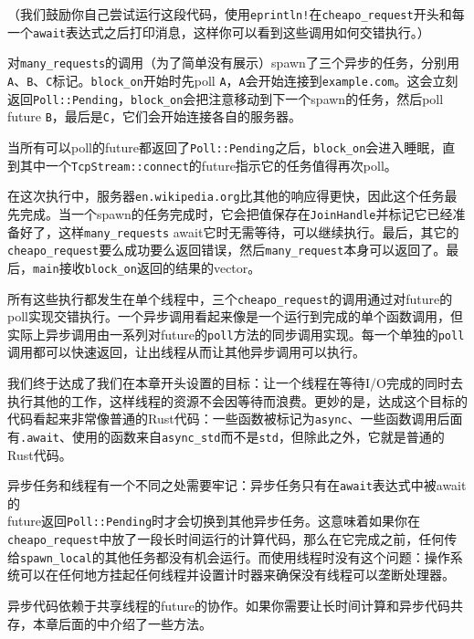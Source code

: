 （我们鼓励你自己尝试运行这段代码，使用\texttt{eprintln!}在\texttt{cheapo\_request}开头和每一个\texttt{await}表达式之后打印消息，这样你可以看到这些调用如何交错执行。）

对\texttt{many\_requests}的调用（为了简单没有展示）spawn了三个异步的任务，分别用\texttt{A}、\texttt{B}、\texttt{C}标记。\texttt{block\_on}开始时先poll \texttt{A}，\texttt{A}会开始连接到\texttt{example.com}。这会立刻返回\texttt{Poll::Pending}，\texttt{block\_on}会把注意移动到下一个spawn的任务，然后poll future \texttt{B}，最后是\texttt{C}，它们会开始连接各自的服务器。

当所有可以poll的future都返回了\texttt{Poll::Pending}之后，\texttt{block\_on}会进入睡眠，直到其中一个\texttt{TcpStream::connect}的future指示它的任务值得再次poll。

在这次执行中，服务器\texttt{en.wikipedia.org}比其他的响应得更快，因此这个任务最先完成。当一个spawn的任务完成时，它会把值保存在\texttt{JoinHandle}并标记它已经准备好了，这样\texttt{many\_requests} await它时无需等待，可以继续执行。最后，其它的\texttt{cheapo\_request}要么成功要么返回错误，然后\texttt{many\_request}本身可以返回了。最后，\texttt{main}接收\texttt{block\_on}返回的结果的vector。

所有这些执行都发生在单个线程中，三个\texttt{cheapo\_request}的调用通过对future的poll实现交错执行。一个异步调用看起来像是一个运行到完成的单个函数调用，但实际上异步调用由一系列对future的\texttt{poll}方法的同步调用实现。每一个单独的\texttt{poll}调用都可以快速返回，让出线程从而让其他异步调用可以执行。

我们终于达成了我们在本章开头设置的目标：让一个线程在等待I/O完成的同时去执行其他的工作，这样线程的资源不会因等待而浪费。更妙的是，达成这个目标的代码看起来非常像普通的Rust代码：一些函数被标记为\texttt{async}、一些函数调用后面有\texttt{.await}、使用的函数来自\texttt{async\_std}而不是\texttt{std}，但除此之外，它就是普通的Rust代码。

异步任务和线程有一个不同之处需要牢记：异步任务只有在\texttt{await}表达式中被await的\\
future返回\texttt{Poll::Pending}时才会切换到其他异步任务。这意味着如果你在\texttt{cheapo\_request}中放了一段长时间运行的计算代码，那么在它完成之前，任何传给\texttt{spawn\_local}的其他任务都没有机会运行。而使用线程时没有这个问题：操作系统可以在任何地方挂起任何线程并设置计时器来确保没有线程可以垄断处理器。

异步代码依赖于共享线程的future的协作。如果你需要让长时间计算和异步代码共存，本章后面的中介绍了一些方法。


